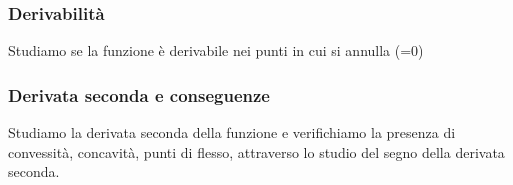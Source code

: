 \documentclass[../analisi.tex]{subfiles}
\begin{document}
\subsubsection{Derivabilità}
Studiamo se la funzione è derivabile nei punti in cui si annulla (=0)


\subsubsection{Derivata seconda e conseguenze}
Studiamo la derivata seconda della funzione e verifichiamo la presenza
di convessità, concavità, punti di flesso, attraverso lo 
studio del segno della derivata seconda.
\end{document}
